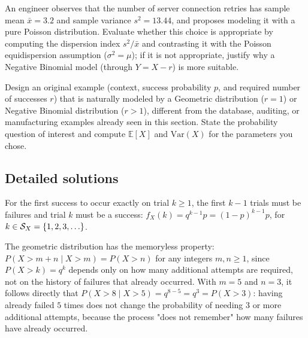 \begin{problema}
	\label{prob:ca5c4c8}
	An engineer observes that the number of server connection retries has sample mean $\bar{x}=3.2$ and sample variance $s^2=13.44$, and proposes modeling it with a pure Poisson distribution. Evaluate whether this choice is appropriate by computing the dispersion index $s^2/\bar{x}$ and contrasting it with the Poisson equidispersion assumption ($\sigma^2=\mu$); if it is not appropriate, justify why a Negative Binomial model (through $Y=X-r$) is more suitable.
\end{problema}

\begin{problema}
	\label{prob:4c2c37d}
	Design an original example (context, success probability $p$, and required number of successes $r$) that is naturally modeled by a Geometric distribution ($r=1$) or Negative Binomial distribution ($r>1$), different from the database, auditing, or manufacturing examples already seen in this section. State the probability question of interest and compute $\mathbb{E}[X]$ and $\text{Var}(X)$ for the parameters you chose.
\end{problema}

\subsection*{Detailed solutions}

\begin{solproblema}
	For the first success to occur exactly on trial $k \ge 1$, the first $k-1$ trials must be failures and trial $k$ must be a success: $f_X(k) = q^{k-1}p = (1-p)^{k-1}p$, for $k \in \mathcal{S}_X = \set{1,2,3,\dots}$.
\end{solproblema}

\begin{solproblema}
	The geometric distribution has the memoryless property: $P(X > m+n \mid X>m) = P(X>n)$ for any integers $m,n\ge1$, since $P(X>k)=q^k$ depends only on how many additional attempts are required, not on the history of failures that already occurred. With $m=5$ and $n=3$, it follows directly that $P(X>8\mid X>5) = q^{8-5} = q^3 = P(X>3)$: having already failed $5$ times does not change the probability of needing $3$ or more additional attempts, because the process "does not remember" how many failures have already occurred.
\end{solproblema}

